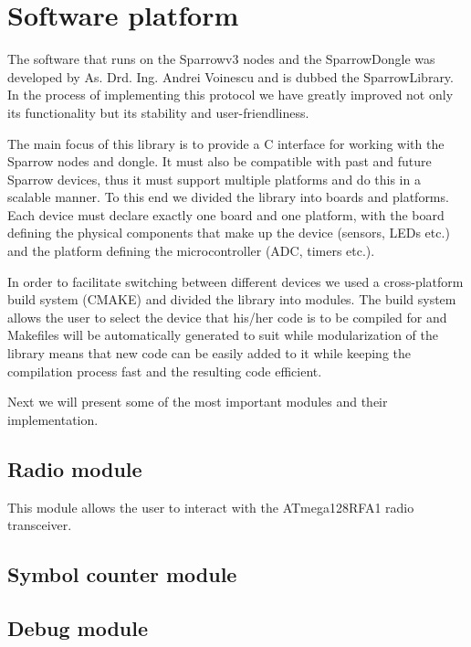 
\chapter{Software platform}

The software that runs on the Sparrowv3 nodes and the SparrowDongle was
developed by As. Drd. Ing. Andrei Voinescu and is dubbed the SparrowLibrary.
In the process of implementing this protocol we have greatly improved not only
its functionality but its stability and user-friendliness.

The main focus of this library is to provide a C interface for working with the
Sparrow nodes and dongle. It must also be compatible with past and future
Sparrow devices, thus it must support multiple platforms and do this in a
scalable manner. To this end we divided the library into boards and platforms.
Each device must declare exactly one board and one platform, with the board
defining the physical components that make up the device (sensors, LEDs etc.)
and the platform defining the microcontroller (ADC, timers etc.). 

In order to facilitate switching between different devices we used a
cross-platform build system (CMAKE) and divided the library into modules. The
build system allows the user to select the device that his/her code is to be
compiled for and Makefiles will be automatically generated to suit while
modularization of the library means that new code can be easily added to it
while keeping the compilation process fast and the resulting code efficient.

Next we will present some of the most important modules and their
implementation.

\section{Radio module}

This module allows the user to interact with the ATmega128RFA1 radio
transceiver. 

\section{Symbol counter module}

\section{Debug module}

